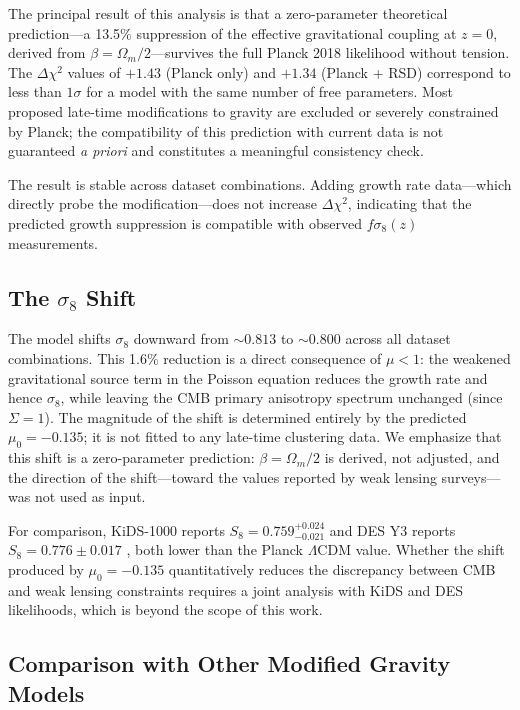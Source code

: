 \documentclass[11pt]{article}
\begin{document}
The principal result of this analysis is that a zero-parameter theoretical prediction---a 13.5\% suppression of the effective gravitational coupling at $z = 0$, derived from $\beta = \Omega_m/2$---survives the full Planck 2018 likelihood without tension.
The $\Delta\chi^2$ values of $+1.43$ (Planck only) and $+1.34$ (Planck + RSD) correspond to less than $1\sigma$ for a model with the same number of free parameters.
Most proposed late-time modifications to gravity are excluded or severely constrained by Planck; the compatibility of this prediction with current data is not guaranteed \emph{a priori} and constitutes a meaningful consistency check.

The result is stable across dataset combinations.
Adding growth rate data---which directly probe the modification---does not increase $\Delta\chi^2$, indicating that the predicted growth suppression is compatible with observed $f\sigma_8(z)$ measurements.

\subsection{The $\sigma_8$ Shift}
\label{sec:s8_shift}

The model shifts $\sigma_8$ downward from $\sim 0.813$ to $\sim 0.800$ across all dataset combinations.
This 1.6\% reduction is a direct consequence of $\mu < 1$: the weakened gravitational source term in the Poisson equation reduces the growth rate and hence $\sigma_8$, while leaving the CMB primary anisotropy spectrum unchanged (since $\Sigma = 1$).
The magnitude of the shift is determined entirely by the predicted $\mu_0 = -0.135$; it is not fitted to any late-time clustering data.
We emphasize that this shift is a zero-parameter prediction: $\beta = \Omega_m/2$ is derived, not adjusted, and the direction of the shift---toward the values reported by weak lensing surveys---was not used as input.

For comparison, KiDS-1000 reports $S_8 = 0.759^{+0.024}_{-0.021}$ \citep{KiDS1000} and DES Y3 reports $S_8 = 0.776 \pm 0.017$ \citep{DESY3}, both lower than the Planck $\Lambda$CDM value.
Whether the shift produced by $\mu_0 = -0.135$ quantitatively reduces the discrepancy between CMB and weak lensing constraints requires a joint analysis with KiDS and DES likelihoods, which is beyond the scope of this work.


\subsection{Comparison with Other Modified Gravity Models}
\label{sec:signature}
\end{document}
